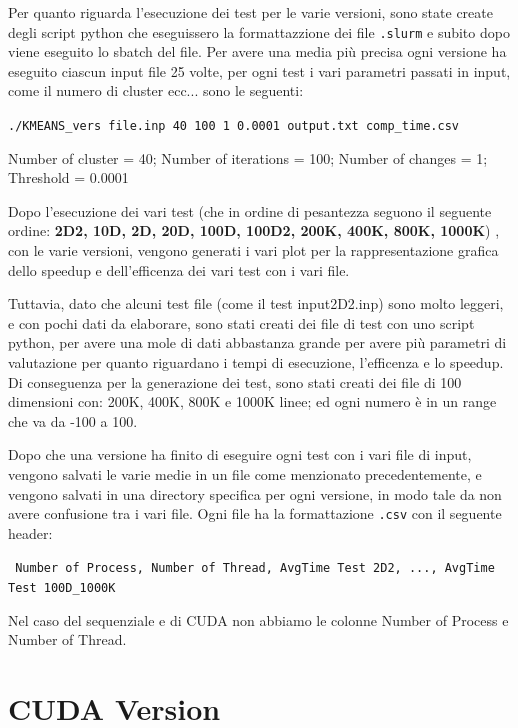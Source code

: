 \documentclass{article}
\begin{document}
  Per quanto riguarda l'esecuzione dei test per le varie versioni, sono state create degli script python che eseguissero la formattazzione dei file \verb|.slurm| e 
  subito dopo viene eseguito lo sbatch del file. Per avere una media più precisa ogni versione ha eseguito ciascun input file 25 volte, per ogni test i vari parametri passati in input, come il numero di cluster ecc... sono le seguenti:
  \begin{center}
    \verb|./KMEANS_vers file.inp 40 100 1 0.0001 output.txt comp_time.csv|
  \end{center}
  \begin{center}
    \small Number of cluster = 40; Number of iterations = 100; Number of changes = 1; Threshold = 0.0001
  \end{center}
  Dopo l'esecuzione dei vari test (che in ordine di pesantezza seguono il seguente ordine: \textbf{2D2, 10D, 2D, 20D, 100D, 100D2, 200K, 400K, 800K, 1000K}) , con le varie versioni, 
  vengono generati i vari plot per la rappresentazione grafica dello speedup e dell'efficenza dei vari test con i vari file.
  
  Tuttavia, dato che alcuni test file (come il test input2D2.inp) sono molto leggeri, e con pochi dati da elaborare, sono stati creati dei file di test con uno script python, per avere una mole di dati abbastanza grande per 
  avere più parametri di valutazione per quanto riguardano i tempi di esecuzione, l'efficenza e lo speedup. Di conseguenza per la generazione dei test, sono stati creati dei file di 100 dimensioni con: 200K, 400K, 800K e 1000K linee; ed 
  ogni numero è in un range che va da -100 a 100.

  Dopo che una versione ha finito di eseguire ogni test con i vari file di input, vengono salvati le varie medie 
  in un file come menzionato precedentemente, e vengono salvati in una directory specifica per ogni versione, in modo tale da non avere confusione tra i vari file. Ogni file ha la formattazione \verb|.csv| con il seguente 
  header:
  \begin{center}
    \verb| Number of Process, Number of Thread, AvgTime Test 2D2, ..., AvgTime Test 100D_1000K |   
  \end{center}
  \begin{center}
    \small *Nel caso del sequenziale e di CUDA non abbiamo le colonne Number of Process e Number of Thread.
  \end{center}

  \section{CUDA Version}
\end{document}
